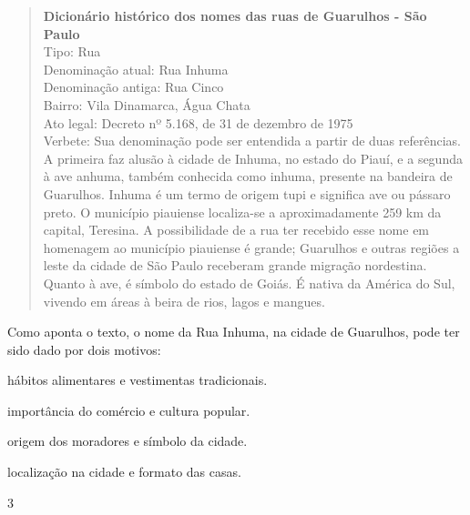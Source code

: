 \begin{quote}
\textbf{Dicionário histórico dos nomes das ruas de Guarulhos - São Paulo}\\
Tipo: Rua\\
Denominação atual: Rua Inhuma\\
Denominação antiga: Rua Cinco\\
Bairro: Vila Dinamarca, Água Chata\\
Ato legal: Decreto nº 5.168, de 31 de dezembro de 1975\\
Verbete: Sua denominação pode ser entendida a partir de duas
referências. A primeira faz alusão à cidade de Inhuma, no estado do
Piauí, e a segunda à ave anhuma, também conhecida como inhuma, presente
na bandeira de Guarulhos. Inhuma é um termo de origem tupi e significa
ave ou pássaro preto. O município piauiense localiza-se a
aproximadamente 259 km da capital, Teresina. A possibilidade de a rua
ter recebido esse nome em homenagem ao município piauiense é grande;
Guarulhos e outras regiões a leste da cidade de São Paulo receberam
grande migração nordestina. Quanto à ave, é símbolo do estado de Goiás.
É nativa da América do Sul, vivendo em áreas à beira de rios, lagos e
mangues.

\end{quote}

\pagebreak
\noindent{}Como aponta o texto, o nome da Rua Inhuma, na cidade de Guarulhos, pode
ter sido dado por dois motivos:

\begin{escolha}
\item hábitos alimentares e vestimentas tradicionais.

\item importância do comércio e cultura popular.

\item origem dos moradores e símbolo da cidade.

\item localização na cidade e formato das casas.
\end{escolha}


\num{3}

